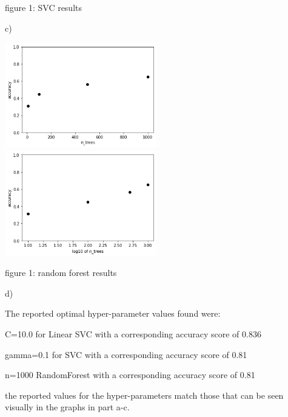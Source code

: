 \documentclass{homework}
\begin{document}
\caption{figure 1: SVC results}

\raggedright



c)

\centering
\includegraphics[width=250]{2c.png}
\includegraphics[width=250]{2c2.png}

\caption{figure 1: random forest results}

\raggedright


d)

The reported optimal hyper-parameter values found were:
\newline


C=10.0 for Linear SVC with a corresponding accuracy score of 0.836
\newline


gamma=0.1 for SVC with a corresponding accuracy score of 0.81
\newline


n=1000 RandomForest with a corresponding accuracy score of 0.81
\newline


the reported values for the hyper-parameters match those that can be seen visually in the graphs in part a-c.
\end{document}
